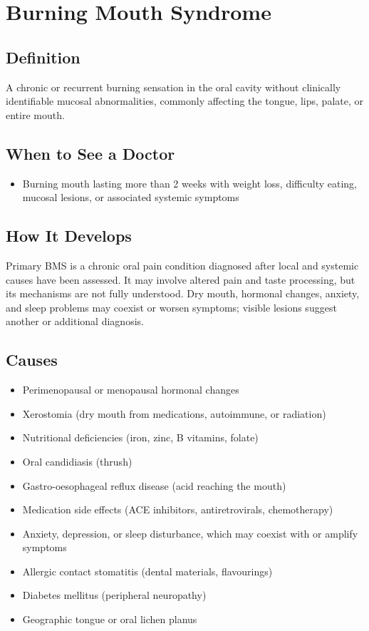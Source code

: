 \chapter{Burning Mouth Syndrome}

\section*{Definition}
A chronic or recurrent burning sensation in the oral cavity without clinically identifiable mucosal abnormalities, commonly affecting the tongue, lips, palate, or entire mouth.

\section*{When to See a Doctor}

\begin{itemize}
 \item Burning mouth lasting more than 2 weeks with weight loss, difficulty eating, mucosal lesions, or associated systemic symptoms
\end{itemize}

\section*{How It Develops}
Primary BMS is a chronic oral pain condition diagnosed after local and systemic causes have been assessed. It may involve altered pain and taste processing, but its mechanisms are not fully understood. Dry mouth, hormonal changes, anxiety, and sleep problems may coexist or worsen symptoms; visible lesions suggest another or additional diagnosis.

\section*{Causes}
\begin{itemize}
 \item Perimenopausal or menopausal hormonal changes
 \item Xerostomia (dry mouth from medications, autoimmune, or radiation)
 \item Nutritional deficiencies (iron, zinc, B vitamins, folate)
 \item Oral candidiasis (thrush)
 \item Gastro-oesophageal reflux disease (acid reaching the mouth)
 \item Medication side effects (ACE inhibitors, antiretrovirals, chemotherapy)
 \item Anxiety, depression, or sleep disturbance, which may coexist with or amplify symptoms
 \item Allergic contact stomatitis (dental materials, flavourings)
 \item Diabetes mellitus (peripheral neuropathy)
 \item Geographic tongue or oral lichen planus
\end{itemize}


